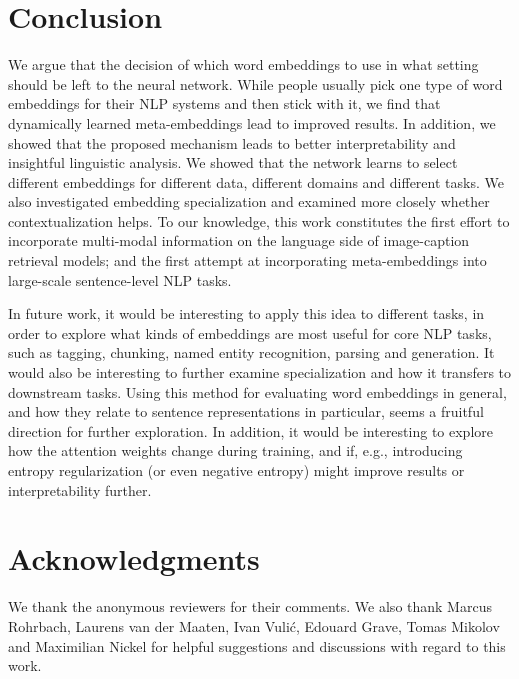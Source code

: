 \documentclass[11pt,a4paper]{article}
\begin{document}
\section{Conclusion}

We argue that the decision of which word embeddings to use in what setting should be left to the neural network. While people usually pick one type of word embeddings for their NLP systems and then stick with it, we find that dynamically learned meta-embeddings lead to improved results. In addition, we showed that the proposed mechanism leads to better interpretability and insightful linguistic analysis. We showed that the network learns to select different embeddings for different data, different domains and different tasks. We also investigated embedding specialization and examined more closely whether contextualization helps. To our knowledge, this work constitutes the first effort to incorporate multi-modal information on the language side of image-caption retrieval models; and the first attempt at incorporating meta-embeddings into large-scale sentence-level NLP tasks.

In future work, it would be interesting to apply this idea to different tasks, in order to explore what kinds of embeddings are most useful for core NLP tasks, such as tagging, chunking, named entity recognition, parsing and generation. It would also be interesting to further examine specialization and how it transfers to downstream tasks. Using this method for evaluating word embeddings in general, and how they relate to sentence representations in particular, seems a fruitful direction for further exploration. In addition, it would be interesting to explore how the attention weights change during training, and if, e.g., introducing entropy regularization (or even negative entropy) might improve results or interpretability further.

\section*{Acknowledgments}

We thank the anonymous reviewers for their comments. We also thank Marcus Rohrbach, Laurens van der Maaten, Ivan Vuli\'c, Edouard Grave, Tomas Mikolov and Maximilian Nickel for helpful suggestions and discussions with regard to this work.



\end{document}
